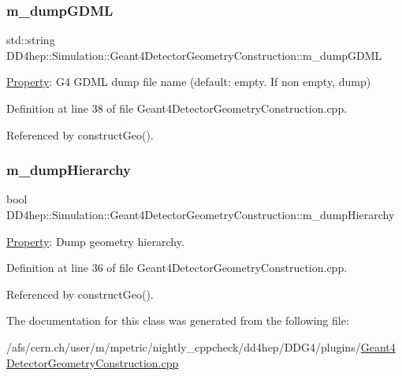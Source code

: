 \subsubsection{\texorpdfstring{m\+\_\+dump\+G\+D\+ML}{m\_dumpGDML}}
{\footnotesize\ttfamily std\+::string D\+D4hep\+::\+Simulation\+::\+Geant4\+Detector\+Geometry\+Construction\+::m\+\_\+dump\+G\+D\+ML\hspace{0.3cm}{\ttfamily [private]}}



\hyperlink{class_d_d4hep_1_1_property}{Property}\+: G4 G\+D\+ML dump file name (default\+: empty. If non empty, dump) 



Definition at line 38 of file Geant4\+Detector\+Geometry\+Construction.\+cpp.



Referenced by construct\+Geo().

\hypertarget{class_d_d4hep_1_1_simulation_1_1_geant4_detector_geometry_construction_ac003c6513973e596d5d214206c3f8d99}{}\label{class_d_d4hep_1_1_simulation_1_1_geant4_detector_geometry_construction_ac003c6513973e596d5d214206c3f8d99} 
\subsubsection{\texorpdfstring{m\+\_\+dump\+Hierarchy}{m\_dumpHierarchy}}
{\footnotesize\ttfamily bool D\+D4hep\+::\+Simulation\+::\+Geant4\+Detector\+Geometry\+Construction\+::m\+\_\+dump\+Hierarchy\hspace{0.3cm}{\ttfamily [private]}}



\hyperlink{class_d_d4hep_1_1_property}{Property}\+: Dump geometry hierarchy. 



Definition at line 36 of file Geant4\+Detector\+Geometry\+Construction.\+cpp.



Referenced by construct\+Geo().



The documentation for this class was generated from the following file\+:\begin{DoxyCompactItemize}
\item 
/afs/cern.\+ch/user/m/mpetric/nightly\+\_\+cppcheck/dd4hep/\+D\+D\+G4/plugins/\hyperlink{_geant4_detector_geometry_construction_8cpp}{Geant4\+Detector\+Geometry\+Construction.\+cpp}\end{DoxyCompactItemize}
